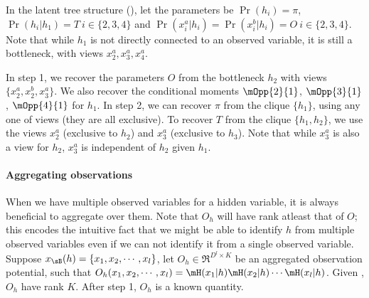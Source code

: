 In the latent tree structure (), let the
  parameters be $\Pr(h_i) = \pi$, $\Pr(h_i | h_1) = T ~i \in \{2,3,4\}$
  and $\Pr(x^a_i | h_i) = \Pr(x^b_i | h_i) = O ~i \in \{2,3,4\}$.
Note that while $h_1$ is not directly connected to an observed variable,
  it is still a bottleneck, with views $x^a_2, x^a_3, x^a_4$.

In step 1, we recover the parameters $O$ from the bottleneck $h_2$ with
  views $\{x^a_2, x^b_2, x^a_3\}$. We also recover the conditional moments
  $\mOpp{2}{1}$, $\mOpp{3}{1}$, $\mOpp{4}{1}$ for $h_1$. 
In step 2, we can recover $\pi$ from the clique $\{h_1\}$, using any
  one of views (they are all exclusive). 
To recover $T$ from the clique $\{h_1, h_2\}$, we use the views $x^a_2$
  (exclusive to $h_2$) and $x^a_3$ (exclusive to $h_3$). Note that while
  $x^a_3$ is also a view for $h_2$, $x^a_3$ is independent of $h_2$ given
  $h_1$.


\paragraph{Aggregating observations}
When we have multiple observed variables for a hidden variable, it is
  always beneficial to aggregate over them.
Note that $O_h$ will have rank atleast that of $O$; this encodes the
  intuitive fact that we might be able to identify $h$ from multiple
  observed variables even if we can not identify it from a single
  observed variable. 
Suppose $x_\sB(h) = \{x_1, x_2, \cdots, x_l\}$, let $O_h \in
  \Re^{D^l \times K}$ be an
  aggregated observation potential, such that $O_h(x_1, x_2, \cdots,
  x_l) = \mH(x_1|h) \mH(x_2|h) \cdots \mH(x_l|h)$.
Given , $O_h$ have rank $K$.
After step 1, $O_h$ is a known quantity.

